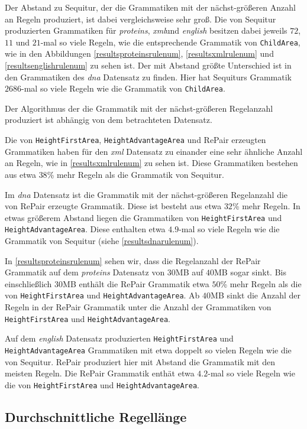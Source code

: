 Der Abstand zu Sequitur, der die Grammatiken mit der nächst-größeren Anzahl an Regeln produziert, ist dabei vergleichsweise sehr groß. Die von Sequitur produzierten Grammatiken für \emph{proteins}, \emph{xml}und \emph{english} besitzen dabei jeweils $72$, $11$ und $21$-mal so viele Regeln, wie die entsprechende Grammatik von \texttt{ChildArea}, wie in den Abbildungen \autoref{resultsproteinsrulenum}, \autoref{resultsxmlrulenum} und \autoref{resultsenglishrulenum} zu sehen ist.
Der mit Abstand größte Unterschied ist in den Grammatiken des \emph{dna} Datensatz zu finden. Hier hat Sequiturs Grammatik $2686$-mal so viele Regeln wie die Grammatik von \texttt{ChildArea}. 

Der Algorithmus der die Grammatik mit der nächst-größeren Regelanzahl produziert ist abhängig von dem betrachteten Datensatz. 

Die von \texttt{HeightFirstArea}, \texttt{HeightAdvantageArea} und RePair erzeugten Grammatiken haben für den \emph{xml} Datensatz zu einander eine sehr ähnliche Anzahl an Regeln, wie in \autoref{resultsxmlrulenum} zu sehen ist. Diese Grammatiken bestehen aus etwa $38$\% mehr Regeln als die Grammatik von Sequitur.

Im \emph{dna} Datensatz ist die Grammatik mit der nächst-größeren Regelanzahl die von RePair erzeugte Grammatik. Diese ist besteht aus etwa $32$\% mehr Regeln. In etwas größerem Abstand liegen die Grammatiken von \texttt{HeightFirstArea} und \texttt{HeightAdvantageArea}. Diese enthalten etwa $4.9$-mal so viele Regeln wie die Grammatik von Sequitur (siehe \autoref{resultsdnarulenum}).

In \autoref{resultsproteinsrulenum} sehen wir, dass die Regelanzahl der RePair Grammatik auf dem \emph{proteins} Datensatz von $30$MB auf $40$MB sogar sinkt. Bis einschließlich $30$MB enthält die RePair Grammatik etwa $50$\% mehr Regeln als die von \texttt{HeightFirstArea} und \texttt{HeightAdvantageArea}. Ab $40$MB sinkt die Anzahl der Regeln in der RePair Grammatik unter die Anzahl der Grammatiken von \texttt{HeightFirstArea} und \texttt{HeightAdvantageArea}.

Auf dem \emph{english} Datensatz produzierten \texttt{HeightFirstArea} und \texttt{HeightAdvantageArea} Grammatiken mit etwa doppelt so vielen Regeln wie die von Sequitur.
RePair produziert hier mit Abstand die Grammatik mit den meisten Regeln. Die RePair Grammatik enthät etwa $4.2$-mal so viele Regeln wie die von \texttt{HeightFirstArea} und \texttt{HeightAdvantageArea}.

\subsection{Durchschnittliche Regellänge}

